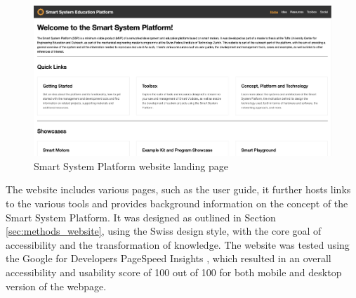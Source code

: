 \begin{figure}[H]
    \centering
    \includegraphics[width=\linewidth]{overleaf/images/website_landing_page.png}
    \vspace{\ftspace}
    \caption{Smart System Platform website landing page}
    \vspace{\ftspace}
    \label{fig:website_landing}
\end{figure}

The website includes various pages, such as the user guide, it further hosts links to the various tools and provides background information on the concept of the Smart System Platform. It was designed as outlined in Section \ref{sec:methods_website}, using the Swiss design style, with the core goal of accessibility and the transformation of knowledge. The website was tested using the Google for Developers PageSpeed Insights \citep{noauthor_about_nodate}, which resulted in an overall accessibility and usability score of 100 out of 100 for both mobile and desktop version of the webpage.

